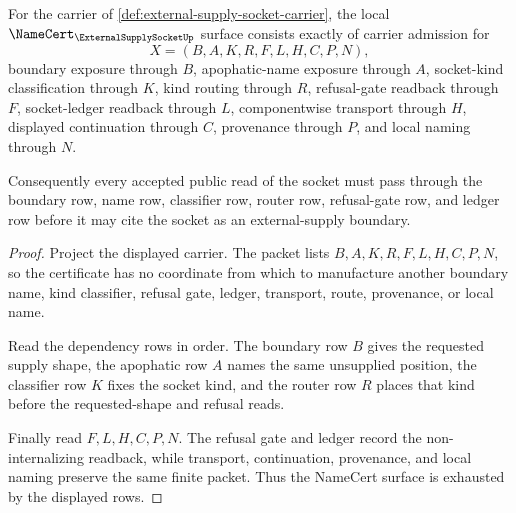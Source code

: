 \begin{theorem}
\label{thm:external-supply-socket-namecert-surface}
For the carrier of \autoref{def:external-supply-socket-carrier}, the local $\NameCert_{\ExternalSupplySocketUp}$ surface consists exactly of carrier admission for
$$
X=(B,A,K,R,F,L,H,C,P,N),
$$
boundary exposure through $B$, apophatic-name exposure through $A$, socket-kind classification through $K$, kind routing through $R$, refusal-gate readback through $F$, socket-ledger readback through $L$, componentwise transport through $H$, displayed continuation through $C$, provenance through $P$, and local naming through $N$.

Consequently every accepted public read of the socket must pass through the boundary row, name row, classifier row, router row, refusal-gate row, and ledger row before it may cite the socket as an external-supply boundary.
\end{theorem}
\begin{proof}
Project the displayed carrier. The packet lists $B,A,K,R,F,L,H,C,P,N$, so the certificate has no coordinate from which to manufacture another boundary name, kind classifier, refusal gate, ledger, transport, route, provenance, or local name.

Read the dependency rows in order. The boundary row $B$ gives the requested supply shape, the apophatic row $A$ names the same unsupplied position, the classifier row $K$ fixes the socket kind, and the router row $R$ places that kind before the requested-shape and refusal reads.

Finally read $F,L,H,C,P,N$. The refusal gate and ledger record the non-internalizing readback, while transport, continuation, provenance, and local naming preserve the same finite packet. Thus the NameCert surface is exhausted by the displayed rows.
\end{proof}

